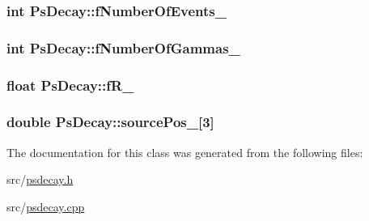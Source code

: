 \subsubsection[{\texorpdfstring{f\+Number\+Of\+Events\+\_\+}{fNumberOfEvents_}}]{\setlength{\rightskip}{0pt plus 5cm}int Ps\+Decay\+::f\+Number\+Of\+Events\+\_\+\hspace{0.3cm}{\ttfamily [private]}}\hypertarget{classPsDecay_a32e3f4712d0c7a995d0b8c959c720e79}{}\label{classPsDecay_a32e3f4712d0c7a995d0b8c959c720e79}
\subsubsection[{\texorpdfstring{f\+Number\+Of\+Gammas\+\_\+}{fNumberOfGammas_}}]{\setlength{\rightskip}{0pt plus 5cm}int Ps\+Decay\+::f\+Number\+Of\+Gammas\+\_\+\hspace{0.3cm}{\ttfamily [private]}}\hypertarget{classPsDecay_a7181fb08b4524a9f222bb5178e2b33b4}{}\label{classPsDecay_a7181fb08b4524a9f222bb5178e2b33b4}
\subsubsection[{\texorpdfstring{f\+R\+\_\+}{fR_}}]{\setlength{\rightskip}{0pt plus 5cm}float Ps\+Decay\+::f\+R\+\_\+\hspace{0.3cm}{\ttfamily [private]}}\hypertarget{classPsDecay_a905b6db3efeb23b273e90f2f3984ccd7}{}\label{classPsDecay_a905b6db3efeb23b273e90f2f3984ccd7}
\subsubsection[{\texorpdfstring{source\+Pos\+\_\+}{sourcePos_}}]{\setlength{\rightskip}{0pt plus 5cm}double Ps\+Decay\+::source\+Pos\+\_\+\mbox{[}3\mbox{]}\hspace{0.3cm}{\ttfamily [private]}}\hypertarget{classPsDecay_a66690e9b186fc10c3a494e9e5b2a138f}{}\label{classPsDecay_a66690e9b186fc10c3a494e9e5b2a138f}


The documentation for this class was generated from the following files\+:\begin{DoxyCompactItemize}
\item 
src/\hyperlink{psdecay_8h}{psdecay.\+h}\item 
src/\hyperlink{psdecay_8cpp}{psdecay.\+cpp}\end{DoxyCompactItemize}
